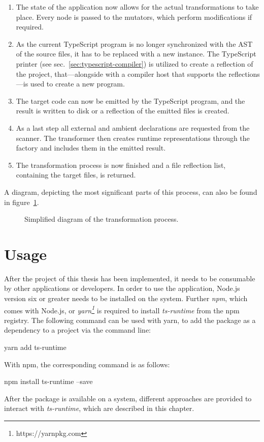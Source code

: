 \begin{enumerate}
  \item The state of the application now allows for the actual transformations to take place. Every node is passed to the mutators, which perform modifications if required.
  \item As the current TypeScript program is no longer synchronized with the AST of the source files, it has to be replaced with a new instance. The TypeScript printer (see sec.~\ref{sec:typescript-compiler}) is utilized to create a reflection of the project, that---alongside with a compiler host that supports the reflections---is used to create a new program.
  \item The target code can now be emitted by the TypeScript program, and the result is written to disk or a reflection of the emitted files is created.
  \item As a last step all external and ambient declarations are requested from the scanner. The transformer then creates runtime representations through the factory and includes them in the emitted result.
  \item The transformation process is now finished and a file reflection list, containing the target files, is returned.
\end{enumerate}
A diagram, depicting the most significant parts of this process, can also be found in figure~\ref{fig:transformation-process}.
\begin{figure}
\centering

\caption{Simplified diagram of the transformation process.}
\label{fig:transformation-process}
\end{figure}

\section{Usage}
\label{sec:usage}

After the project of this thesis has been implemented, it needs to be consumable by other applications or developers. In order to use the application, Node.js version six or greater needs to be installed on the system. Further \emph{npm}, which comes with Node.js, or \emph{yarn\footnote{https://yarnpkg.com}} is required to install \emph{ts-runtime} from the npm registry. The following command can be used with yarn, to add the package as a dependency to a project via the command line:
\begin{GenericCode}[numbers=none]
yarn add ts-runtime
\end{GenericCode}
With npm, the corresponding command is as follows:
\begin{GenericCode}[numbers=none]
npm install ts-runtime --save
\end{GenericCode}
After the package is available on a system, different approaches are provided to interact with \emph{ts-runtime}, which are described in this chapter.

